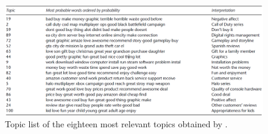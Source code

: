 \documentclass[a4paper]{article}
\begin{document}
	 	
			
		\begin{figure}[p]
			\centering
			\caption{Topic list of the eighteen most relevant topics obtained by \citeauthor{article:muller}.}
			\label{fig:mullertopiclist}
			\includegraphics[width=1\linewidth]{Images/muller_topic_list}
		\end{figure}
		
\end{document}
